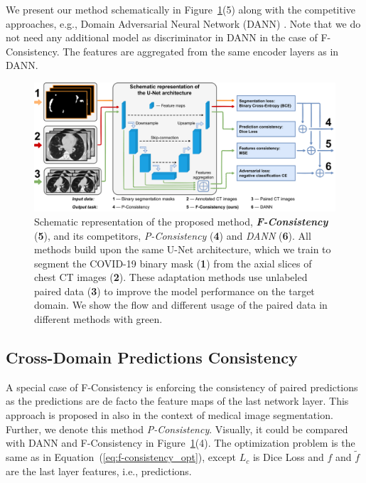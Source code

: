 We present our method schematically in Figure~\ref{fig:method_schematic}(5) along with the competitive approaches, e.g., Domain Adversarial Neural Network (DANN) \cite{ganin2015unsupervised}. Note that we do not need any additional model as discriminator in DANN in the case of F-Consistency. The features are aggregated from the same encoder layers as in DANN.

\begin{landscape}
\begin{figure}[p]
	\centering
	\includegraphics[width=\linewidth]{Dissertation/Figures/3_ct/method_schematic_4.pdf}
	\caption{Schematic representation of the proposed method, \textit{\textbf{F-Consistency}} (\textbf{5}), and its competitors, \textit{P-Consistency} (\textbf{4}) and \textit{DANN} (\textbf{6}). All methods build upon the same U-Net architecture, which we train to segment the COVID-19 binary mask (\textbf{1}) from the axial slices of chest CT images (\textbf{2}). These adaptation methods use unlabeled paired data (\textbf{3}) to improve the model performance on the target domain. We show the flow and different usage of the paired data in different methods with green.\label{fig:method_schematic}}
\end{figure}
\end{landscape}

\subsection{Cross-Domain Predictions Consistency}

A special case of F-Consistency is enforcing the consistency of paired predictions as the predictions are de facto the feature maps of the last network layer. This approach is proposed in \cite{orbes2019multi} also in the context of medical image segmentation. Further, we denote this method \textit{P-Consistency}. Visually, it could be compared with DANN and F-Consistency in Figure~\ref{fig:method_schematic}(4). The optimization problem is the same as in Equation~(\ref{eq:f-consistency_opt}), except $L_c$ is Dice Loss \cite{milletari2016v} and $f$ and $\tilde{f}$ are the last layer features, i.e., predictions.



